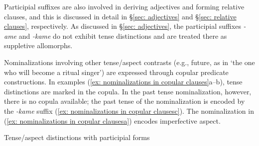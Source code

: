     \z
\z

Participial suffixes are also involved in deriving adjectives and forming relative clauses, and this is discussed in detail in §\ref{sec: adjectives} and §\ref{sec: relative clauses}, respectively. As discussed in §\ref{sec: adjectives}, the participial suffixes \textit{-ame} and \textit{-kame} do not exhibit tense distinctions and are treated there as suppletive allomorphs.

Nominalizations involving other tense/aspect contrasts (e.g., future, as in ‘the one who will become a ritual singer’) are expressed through copular predicate constructions. In examples (\ref{ex: nominalizations in copular clauses}a--b), tense distinctions are marked in the copula. In the past tense nominalization, however, there is no copula available; the past tense of the nominalization is encoded by the  \textit{-kame} suffix (\ref{ex: nominalizations in copular clausesc}). The nominalization in (\ref{ex: nominalizations in copular clausesa}) encodes imperfective aspect.

\largerpage
\ea\label{ex: nominalizations in copular clauses}
{Tense/aspect distinctions with participial forms}

\label{ex: nominalizations in copular clausesa}
{}\label{ex: nominalizations in copular clausesb}
\newpage

\label{ex: nominalizations in copular clausesc}

